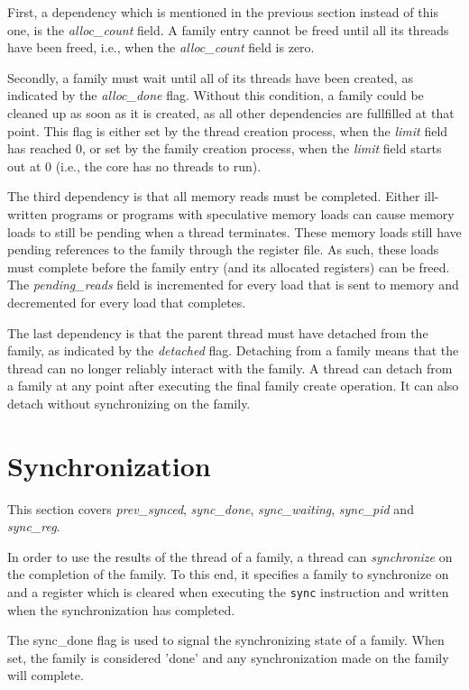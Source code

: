 First, a dependency which is mentioned in the previous section instead of this one, is the \emph{alloc\_count} field. A family entry cannot be freed until all its threads have been freed, i.e., when the \emph{alloc\_count} field is zero.

Secondly, a family must wait until all of its threads have been created, as indicated by the \emph{alloc\_done} flag. Without this condition, a family could be cleaned up as soon as it is created, as all other dependencies are fullfilled at that point. This flag is either set by the thread creation process, when the \emph{limit} field has reached 0, or set by the family creation process, when the \emph{limit} field starts out at 0 (i.e., the core has no threads to run).

The third dependency is that all memory reads must be completed. Either ill-written programs or programs with speculative memory loads can cause memory loads to still be pending when a thread terminates. These memory loads still have pending references to the family through the register file. As such, these loads must complete before the family entry (and its allocated registers) can be freed. The \emph{pending\_reads} field is incremented for every load that is sent to memory and decremented for every load that completes.

The last dependency is that the parent thread must have detached from the family, as indicated by the \emph{detached} flag. Detaching from a family means that the thread can no longer reliably interact with the family. A thread can detach from a family at any point after executing the final family create operation. It can also detach without synchronizing on the family.

\section{Synchronization}
This section covers \emph{prev\_synced}, \emph{sync\_done}, \emph{sync\_waiting}, \emph{sync\_pid} and \emph{sync\_reg}.

In order to use the results of the thread of a family, a thread can \emph{synchronize} on the completion of the family. To this end, it specifies a family to synchronize on and a register which is cleared when executing the {\tt sync} instruction and written when the synchronization has completed.

The sync\_done flag is used to signal the synchronizing state of a family. When set, the family is considered 'done' and any synchronization made on the family will complete.

